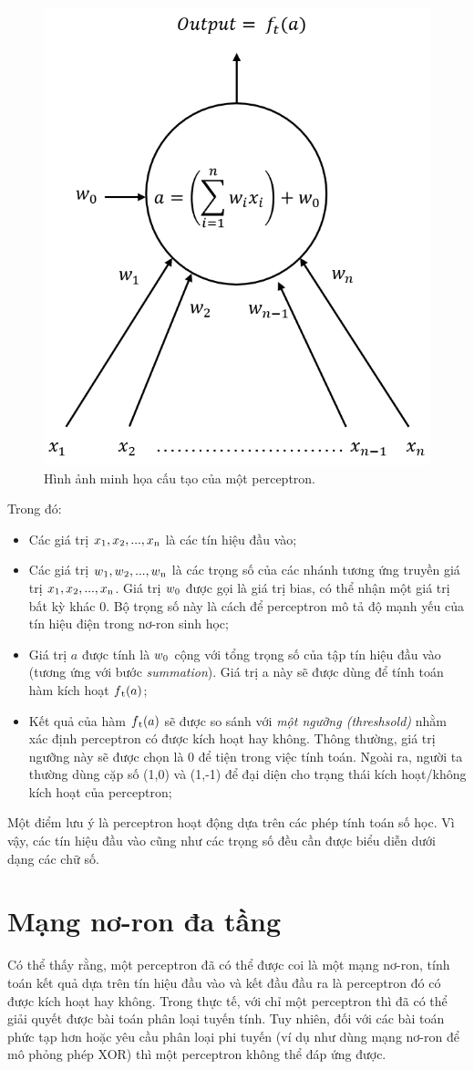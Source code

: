 \begin{figure}[!h]
	\centering
		\includegraphics[width=0.4\columnwidth]{chapter01/figure/Picture2.png}
		\centering
	\caption{Hình ảnh minh họa cấu tạo của một perceptron.}
	\label{fig:structureOfPerceptron}
\end{figure}

\noindent Trong đó:
\begin{itemize}
    \item Các giá trị $x_{1},x\textsubscript{2},...,x\textsubscript{n}$ là các tín hiệu đầu vào;
    \item Các giá trị $w\textsubscript{1},w\textsubscript{2},...,w\textsubscript{n}$ là các trọng số của các nhánh tương ứng truyền giá trị $x\textsubscript{1},x\textsubscript{2},...,x\textsubscript{n}$. Giá trị $w\textsubscript{0}$ được gọi là giá trị bias, có thể nhận một giá trị bất kỳ khác 0. Bộ trọng số này là cách để perceptron mô tả độ mạnh yếu của tín hiệu điện trong nơ-ron sinh học;
    \item Giá trị $a$ được tính là $w\textsubscript{0}$ cộng với tổng trọng số của tập tín hiệu đầu vào (tương ứng với bước \textit{summation}). Giá trị a này sẽ được dùng để tính toán hàm kích hoạt $f\textsubscript{t}(a)$;
    \item Kết quả của hàm $f\textsubscript{t}(a)$ sẽ được so sánh với \textit{một ngưỡng (threshsold)} nhằm xác định perceptron có được kích hoạt hay không. Thông thường, giá trị ngưỡng này sẽ được chọn là 0 để tiện trong việc tính toán. Ngoài ra, người ta thường dùng cặp số (1,0) và (1,-1) để đại diện cho trạng thái kích hoạt/không kích hoạt của perceptron;
\end{itemize}
Một điểm lưu ý là perceptron hoạt động dựa trên các phép tính toán số học. Vì vậy, các tín hiệu đầu vào cũng như các trọng số đều cần được biểu diễn dưới dạng các chữ số.

\section{Mạng nơ-ron đa tầng}
\label{sec:MLP}
Có thể thấy rằng, một perceptron đã có thể được coi là một mạng nơ-ron, tính toán kết quả dựa trên tín hiệu đầu vào và kết đầu đầu ra là perceptron đó có được kích hoạt hay không. Trong thực tế, với chỉ một perceptron thì đã có thể giải quyết được bài toán phân loại tuyến tính. Tuy nhiên, đối với các bài toán phức tạp hơn hoặc yêu cầu phân loại phi tuyến (ví dụ như dùng mạng nơ-ron để mô phỏng phép XOR) thì một perceptron không thể đáp ứng được. 
